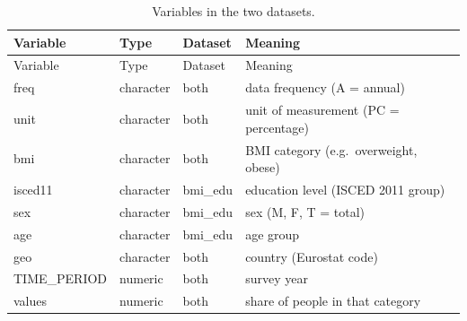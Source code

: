\documentclass[
]{article}
\begin{document}
\begin{longtable}[]{@{}
  >{\raggedright\arraybackslash}p{}
  >{\raggedright\arraybackslash}p{}
  >{\raggedright\arraybackslash}p{}
  >{\raggedright\arraybackslash}p{}@{}}
\caption{Variables in the two datasets.}\tabularnewline
\toprule\noalign{}
\begin{minipage}[b]{\linewidth}\raggedright
Variable
\end{minipage} & \begin{minipage}[b]{\linewidth}\raggedright
Type
\end{minipage} & \begin{minipage}[b]{\linewidth}\raggedright
Dataset
\end{minipage} & \begin{minipage}[b]{\linewidth}\raggedright
Meaning
\end{minipage} \\
\midrule\noalign{}
\endfirsthead
\toprule\noalign{}
\begin{minipage}[b]{\linewidth}\raggedright
Variable
\end{minipage} & \begin{minipage}[b]{\linewidth}\raggedright
Type
\end{minipage} & \begin{minipage}[b]{\linewidth}\raggedright
Dataset
\end{minipage} & \begin{minipage}[b]{\linewidth}\raggedright
Meaning
\end{minipage} \\
\midrule\noalign{}
\endhead
\bottomrule\noalign{}
\endlastfoot
freq & character & both & data frequency (A = annual) \\
unit & character & both & unit of measurement (PC = percentage) \\
bmi & character & both & BMI category (e.g.~overweight, obese) \\
isced11 & character & bmi\_edu & education level (ISCED 2011 group) \\
sex & character & bmi\_edu & sex (M, F, T = total) \\
age & character & bmi\_edu & age group \\
geo & character & both & country (Eurostat code) \\
TIME\_PERIOD & numeric & both & survey year \\
values & numeric & both & share of people in that category \\
\end{longtable}
\end{document}
